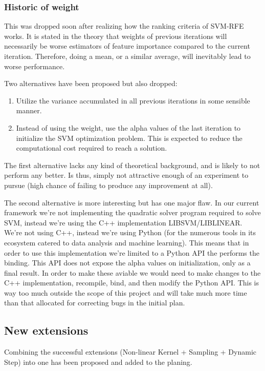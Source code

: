 \subsubsection*{Historic of weight}
This was dropped soon after realizing how the ranking criteria of SVM-RFE works. It is stated in the theory that weights of previous iterations will necessarily be worse estimators of feature importance compared to the current iteration. Therefore, doing a mean, or a similar average, will inevitably lead to worse performance.

Two alternatives have been proposed but also dropped:

\begin{enumerate}
    \item Utilize the variance accumulated in all previous iterations in some sensible manner.
    \item Instead of using the weight, use the alpha values of the last iteration to init\-ialize the SVM optimization problem. This is expected to reduce the comput\-ational cost required to reach a solution.
\end{enumerate}

The first alternative lacks any kind of theoretical background, and is likely to not perform any better. Is thus, simply not attractive enough of an experiment to pursue (high chance of failing to produce any improvement at all).

The second alternative is more interesting but has one major flaw. In our current framework we're not implementing the quadratic solver program required to solve SVM, instead we're using the C++ implementation LIBSVM/LIBLINEAR. We're not using C++, instead we're using Python (for the numerous tools in its ecosystem catered to data analysis and machine learning). This means that in order to use this implementation we're limited to a Python API the performs the binding. This API does not expose the alpha values on initialization, only as a final result. In order to make these aviable we would need to make changes to the C++ implementation, recompile, bind, and then modify the Python API. This is way too much outside the scope of this project and will take much more time than that allocated for correcting bugs in the initial plan.

\subsection{New extensions}
Combining the successful extensions (Non-linear Kernel + Sampling + Dynamic Step) into one has been proposed and added to the planing.

